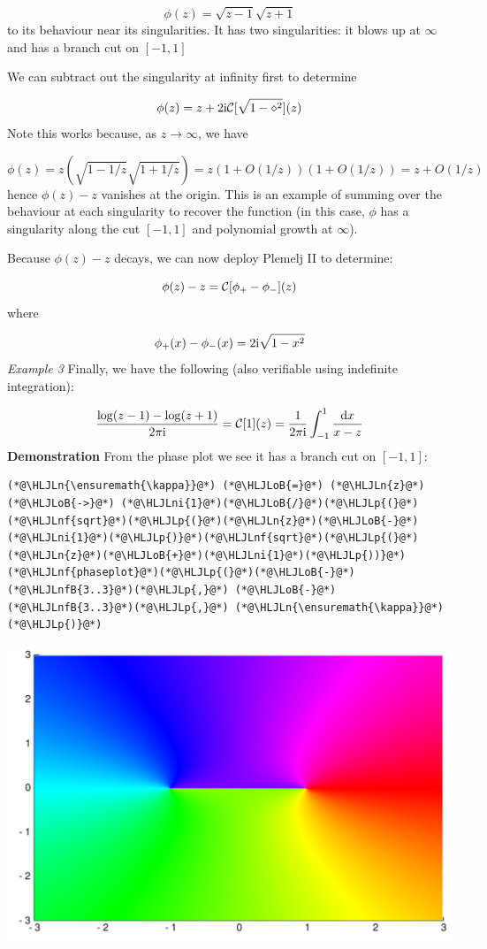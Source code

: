 \documentclass[12pt,a4paper]{article}
\newcommand{\HLJLn}[1]{#1}
\newcommand{\HLJLnf}[1]{\textcolor[RGB]{66,102,213}{#1}}
\newcommand{\HLJLnfB}[1]{\textcolor[RGB]{59,151,46}{#1}}
\newcommand{\HLJLni}[1]{\textcolor[RGB]{59,151,46}{#1}}
\newcommand{\HLJLoB}[1]{\textcolor[RGB]{102,102,102}{\textbf{#1}}}
\newcommand{\HLJLp}[1]{#1}
\def\D{ {\rm d} }
\def\I{ {\rm i} }
\def\CC{ {\cal C} }
\def\dx{\D x}
\begin{document}
\[
\phi(z) = \sqrt{z-1} \sqrt{z+1}
\]
to its behaviour near its singularities. It has two singularities: it blows up at $\infty$ and has a branch cut on $[-1,1]$

We can subtract out the singularity at infinity first to determine

\[
\phi(z) = z  + 2 \I {\cal C}[\sqrt{1-\diamond^2}](z)
\]
Note this works because, as $z \rightarrow \infty$, we have 

\[
\phi(z) = z (\sqrt{1-{1/z}}\sqrt{1 + {1/z}}) = z (1 + O({1/z}))(1+O(1/z)) = z + O(1/z)
\]
hence $\phi(z) - z$ vanishes at the origin. This is an example of summing over the behaviour at each singularity to  recover the function (in this case, $\phi$ has a singularity along the cut $[-1,1]$ and polynomial growth at $\infty$). 

Because $\phi(z)-z$ decays, we can now deploy Plemelj II to determine:

\[
\phi(z) -z = \CC[\phi_+-\phi_-](z)
\]
where

\[
\phi_+(x) - \phi_-(x) = 2\I \sqrt{1-x^2}
\]
\emph{Example 3} Finally, we have the following (also verifiable using indefinite integration):

\[
{\log(z-1) - \log(z+1) \over 2 \pi \I} =  {\cal C}[1](z) = {1 \over 2 \pi \I} \int_{-1}^1 {\dx \over x -z}
\]
\textbf{Demonstration} From the phase plot we see it has a branch cut on $[-1,1]$:


\begin{lstlisting}
(*@\HLJLn{\ensuremath{\kappa}}@*) (*@\HLJLoB{=}@*) (*@\HLJLn{z}@*) (*@\HLJLoB{->}@*) (*@\HLJLni{1}@*)(*@\HLJLoB{/}@*)(*@\HLJLp{(}@*)(*@\HLJLnf{sqrt}@*)(*@\HLJLp{(}@*)(*@\HLJLn{z}@*)(*@\HLJLoB{-}@*)(*@\HLJLni{1}@*)(*@\HLJLp{)}@*)(*@\HLJLnf{sqrt}@*)(*@\HLJLp{(}@*)(*@\HLJLn{z}@*)(*@\HLJLoB{+}@*)(*@\HLJLni{1}@*)(*@\HLJLp{))}@*)
(*@\HLJLnf{phaseplot}@*)(*@\HLJLp{(}@*)(*@\HLJLoB{-}@*)(*@\HLJLnfB{3..3}@*)(*@\HLJLp{,}@*) (*@\HLJLoB{-}@*)(*@\HLJLnfB{3..3}@*)(*@\HLJLp{,}@*) (*@\HLJLn{\ensuremath{\kappa}}@*)(*@\HLJLp{)}@*)
\end{lstlisting}

\includegraphics[width=\linewidth]{figures/Lecture12_4_1.pdf}
\end{document}
